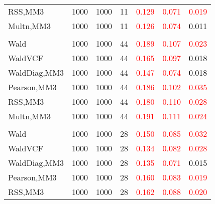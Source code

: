 \documentclass[
]{article}
\begin{document}
\begin{table}[H]
{\begin{tabular}[t]{lrrrrrr}
\hspace{1em}RSS,MM3 & 1000 & 1000 & 11 & \textcolor{red}{0.129} & \textcolor{red}{0.071} & \textcolor{red}{0.019}\\
\hspace{1em}Multn,MM3 & 1000 & 1000 & 11 & \textcolor{red}{0.126} & \textcolor{red}{0.074} & \textcolor{black}{0.011}\\
\addlinespace[0.3em]
\multicolumn{7}{l}{\textbf{1F 15V}}\\
\hspace{1em}Wald & 1000 & 1000 & 44 & \textcolor{red}{0.189} & \textcolor{red}{0.107} & \textcolor{red}{0.023}\\
\hspace{1em}WaldVCF & 1000 & 1000 & 44 & \textcolor{red}{0.165} & \textcolor{red}{0.097} & \textcolor{black}{0.018}\\
\hspace{1em}WaldDiag,MM3 & 1000 & 1000 & 44 & \textcolor{red}{0.147} & \textcolor{red}{0.074} & \textcolor{black}{0.018}\\
\hspace{1em}Pearson,MM3 & 1000 & 1000 & 44 & \textcolor{red}{0.186} & \textcolor{red}{0.102} & \textcolor{red}{0.035}\\
\hspace{1em}RSS,MM3 & 1000 & 1000 & 44 & \textcolor{red}{0.180} & \textcolor{red}{0.110} & \textcolor{red}{0.028}\\
\hspace{1em}Multn,MM3 & 1000 & 1000 & 44 & \textcolor{red}{0.191} & \textcolor{red}{0.111} & \textcolor{red}{0.024}\\
\addlinespace[0.3em]
\multicolumn{7}{l}{\textbf{2F 10V}}\\
\hspace{1em}Wald & 1000 & 1000 & 28 & \textcolor{red}{0.150} & \textcolor{red}{0.085} & \textcolor{red}{0.032}\\
\hspace{1em}WaldVCF & 1000 & 1000 & 28 & \textcolor{red}{0.134} & \textcolor{red}{0.082} & \textcolor{red}{0.028}\\
\hspace{1em}WaldDiag,MM3 & 1000 & 1000 & 28 & \textcolor{red}{0.135} & \textcolor{red}{0.071} & \textcolor{black}{0.015}\\
\hspace{1em}Pearson,MM3 & 1000 & 1000 & 28 & \textcolor{red}{0.160} & \textcolor{red}{0.083} & \textcolor{red}{0.019}\\
\hspace{1em}RSS,MM3 & 1000 & 1000 & 28 & \textcolor{red}{0.162} & \textcolor{red}{0.088} & \textcolor{red}{0.020}\\

\end{tabular}}
\end{table}
\end{document}
